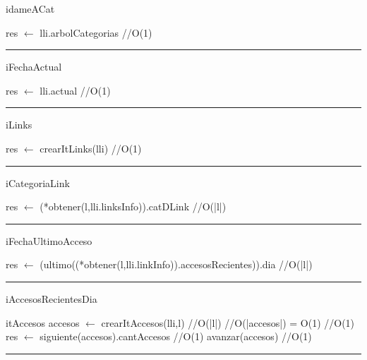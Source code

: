 \begin{algorithm}[H]
\caption{idameACat}
\begin{algorithmic}[1]
\state res $\gets$ lli.arbolCategorias \hfill //O(1)
\EndFunction 
\end{algorithmic}
\hrule
{}
\end{algorithm}

\begin{algorithm}[H]
\caption{iFechaActual}
\begin{algorithmic}[1]
\state res $\gets$ lli.actual \hfill //O(1)
\EndFunction 
\end{algorithmic}
\hrule
{}
\end{algorithm}

\begin{algorithm}[H]
\caption{iLinks}
\begin{algorithmic}[1]
\state res $\gets$ crearItLinks(lli) \hfill //O(1)
\EndFunction 
\end{algorithmic}
\hrule
{}
\end{algorithm}

\begin{algorithm}[H]
\caption{iCategoriaLink}
\begin{algorithmic}[1]
\state res $\gets$ (*obtener(l,lli.linksInfo)).catDLink \hfill //O(|l|)
\EndFunction 
\end{algorithmic}
\hrule
{}
\end{algorithm}

\begin{algorithm}[H]
\caption{iFechaUltimoAcceso}
\begin{algorithmic}[1]
\state res $\gets$ (ultimo((*obtener(l,lli.linkInfo)).accesosRecientes)).dia \hfill //O(|l|)
\EndFunction 
\end{algorithmic}
\hrule
{}
\end{algorithm}

\begin{algorithm}[H]
\caption{iAccesosRecientesDia}
\begin{algorithmic}[1]
\state itAccesos accesos $\gets$ crearItAccesos(lli,l) \hfill //O(|l|)
\hfill //O(|accesos|) = O(1)
 \hfill //O(1)
\state res $\gets$ siguiente(accesos).cantAccesos \hfill //O(1)
\endif
\state avanzar(accesos) \hfill //O(1)
\endwhile
\EndFunction 
\end{algorithmic}
\hrule
{}
\end{algorithm}

